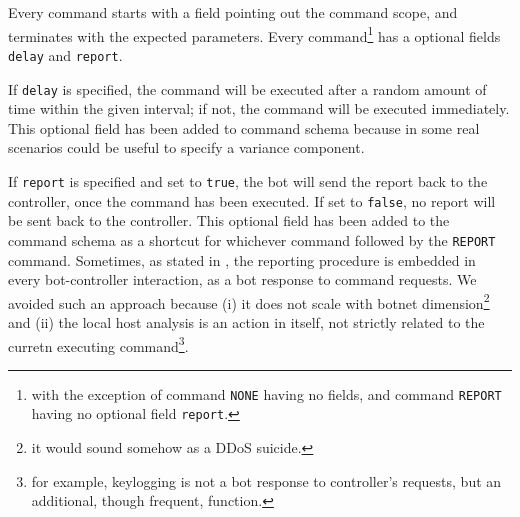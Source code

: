 Every command starts with a field pointing out the command scope, and terminates with the expected parameters.
Every command\footnote{with the exception of command \texttt{NONE} having no fields, and command \texttt{REPORT} having no optional field \texttt{report}.}  has a optional fields \texttt{delay} and \texttt{report}.

If \texttt{delay} is specified, the command will be executed after a random amount of time within the given interval; if not, the command will be executed immediately. This optional field has been added to command schema because in some real scenarios could be useful to specify a variance component.

If \texttt{report} is specified and set to \texttt{true}, the bot will send the report back to the controller, once the command has been executed. If set to \texttt{false}, no report will be sent back to the controller. This optional field has been added to the command schema as a shortcut for whichever command followed by the \texttt{REPORT} command. Sometimes, as stated in \cite{build-your-own-botnet}, the reporting procedure is embedded in every bot-controller interaction, as a bot response to command requests. We avoided such an approach because (i) it does not scale with botnet dimension\footnote{it would sound somehow as a DDoS suicide.} and (ii) the local host analysis is an action in itself, not strictly related to the curretn executing command\footnote{for example, keylogging is not a bot response to controller's requests, but an additional, though frequent, function.}.

